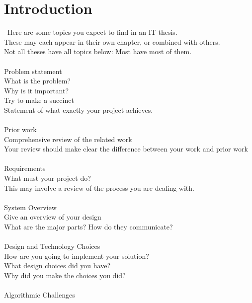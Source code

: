 %
\chapter{Introduction}
\label{sec:intro}


\Blindtext[2][2]

\
Here are some topics you expect to find in an IT thesis. \\
These may each appear in their own chapter, or combined with others. \\
Not all theses have all topics below: Most have most of them. \\
\\
Problem statement \\
    What is the problem? \\
    Why is it important? \\
    Try to make a succinct \\
    Statement of what exactly your project achieves. \\
\\
Prior work \\
    Comprehensive review of the related work \\
    Your review should make clear the difference between your work and prior work \\
\\
Requirements \\
    What must your project do? \\
    This may involve a review of the process you are dealing with. \\
\\
System Overview \\
    Give an overview of your design \\
    What are the major parts?  How do they communicate? \\
\\
Design and Technology Choices \\
    How are you going to implement your solution? \\
    What design choices did you have? \\
    Why did you make the choices you did? \\
\\
Algorithmic Challenges \\
